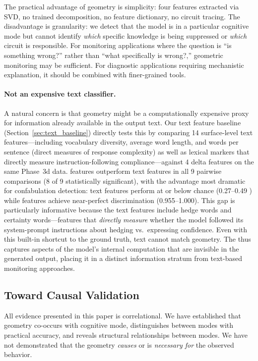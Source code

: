 The practical advantage of \kvcache geometry is simplicity: four features extracted via SVD, no trained decomposition, no feature dictionary, no circuit tracing.
The disadvantage is granularity: we detect that the model is in a particular cognitive mode but cannot identify \emph{which} specific knowledge is being suppressed or \emph{which} circuit is responsible.
For monitoring applications where the question is ``is something wrong?'' rather than ``what specifically is wrong?,'' geometric monitoring may be sufficient.
For diagnostic applications requiring mechanistic explanation, it should be combined with finer-grained tools.

\paragraph{Not an expensive text classifier.}
A natural concern is that \kvcache geometry might be a computationally expensive proxy for information already available in the output text.
Our text feature baseline (Section~\ref{sec:text_baseline}) directly tests this by comparing 14 surface-level text features---including vocabulary diversity, average word length, and words per sentence (direct measures of response complexity) as well as lexical markers that directly measure instruction-following compliance---against 4 \kvcache delta features on the same Phase~3d data.
\kvcache features outperform text features in all 9 pairwise comparisons (8 of 9 statistically significant), with the advantage most dramatic for confabulation detection: text features perform at or below chance (0.27--0.49 \fwl \auroc) while \kvcache features achieve near-perfect discrimination (0.955--1.000).
This gap is particularly informative because the text features include hedge words and certainty words---features that \emph{directly measure} whether the model followed its system-prompt instructions about hedging vs.\ expressing confidence.
Even with this built-in shortcut to the ground truth, text cannot match geometry.
The \kvcache thus captures aspects of the model's internal computation that are invisible in the generated output, placing it in a distinct information stratum from text-based monitoring approaches.

\subsection{Toward Causal Validation}

All evidence presented in this paper is correlational.
We have established that \kvcache geometry co-occurs with cognitive mode, distinguishes between modes with practical accuracy, and reveals structural relationships between modes.
We have not demonstrated that the geometry \emph{causes} or is \emph{necessary for} the observed behavior.

